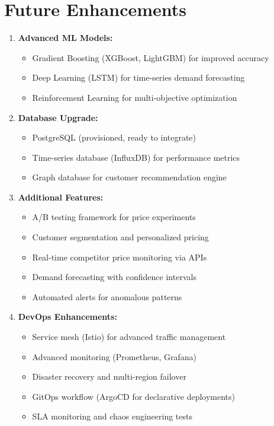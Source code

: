 \documentclass[12pt,a4paper]{report}
\begin{document}
\section{Future Enhancements}

\begin{enumerate}[leftmargin=2em]
    \item \textbf{Advanced ML Models:} 
    \begin{itemize}
        \item Gradient Boosting (XGBoost, LightGBM) for improved accuracy
        \item Deep Learning (LSTM) for time-series demand forecasting
        \item Reinforcement Learning for multi-objective optimization
    \end{itemize}
    
    \item \textbf{Database Upgrade:}
    \begin{itemize}
        \item PostgreSQL (provisioned, ready to integrate)
        \item Time-series database (InfluxDB) for performance metrics
        \item Graph database for customer recommendation engine
    \end{itemize}
    
    \item \textbf{Additional Features:}
    \begin{itemize}
        \item A/B testing framework for price experiments
        \item Customer segmentation and personalized pricing
        \item Real-time competitor price monitoring via APIs
        \item Demand forecasting with confidence intervals
        \item Automated alerts for anomalous patterns
    \end{itemize}
    
    \item \textbf{DevOps Enhancements:}
    \begin{itemize}
        \item Service mesh (Istio) for advanced traffic management
        \item Advanced monitoring (Prometheus, Grafana)
        \item Disaster recovery and multi-region failover
        \item GitOps workflow (ArgoCD for declarative deployments)
        \item SLA monitoring and chaos engineering tests
    \end{itemize}
    

\end{enumerate}
\end{document}
